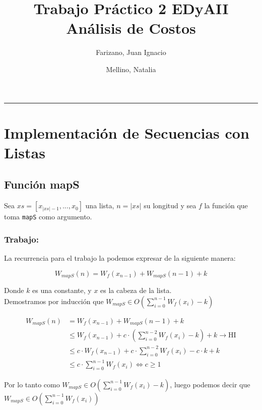 \documentclass[11pt]{article}
\title{Trabajo Práctico 2 EDyAII \\
        \large Análisis de Costos
}
\author{Farizano, Juan Ignacio \and Mellino, Natalia}
\date{}
\begin{document}
\maketitle

\noindent\rule{\textwidth}{1pt}
\section{Implementación de Secuencias con Listas}


\subsection{Función mapS}
Sea $xs = [x_{\vert xs \vert -1},...,x_0]$ una lista, $n = \vert xs \vert$ su longitud
y sea $f$ la función que toma \texttt{mapS} como argumento. 

\subsubsection{Trabajo:}
La recurrencia para el trabajo la podemos expresar de la siguiente manera:

\begin{equation*}
    W_{mapS}(n) = W_f(x_{n- 1}) + W_{mapS}(n - 1) + k
\end{equation*}

Donde $k$ es una constante, y $x$ es la cabeza de la lista. \\

Demostramos por inducción que $ W_{mapS} \in O\left(\displaystyle\sum_{i=0}^{n - 1}W_f(x_i) - k\right) $

\begin{align*}
    W_{mapS}(n) & = W_f(x_{n - 1}) + W_{mapS}(n - 1) + k \\
               & \leq W_f(x_{n - 1}) + c \cdot \left(\displaystyle\sum_{i=0}^{n - 2}W_f(x_i) - k\right) + k \rightarrow \text{HI} \\
               & \leq c \cdot  W_f(x_{n - 1}) + c \cdot \displaystyle\sum_{i=0}^{n - 2}W_f(x_i) - c \cdot k + k \\
               & \leq c \cdot \displaystyle\sum_{i=0}^{n - 1}W_f(x_i) \iff c \geq 1
\end{align*}

Por lo tanto como $ W_{mapS} \in O\left(\displaystyle\sum_{i=0}^{n - 1}W_f(x_i) - k\right) $,
luego podemos decir que $ W_{mapS} \in O\left(\displaystyle\sum_{i=0}^{n - 1}W_f(x_i)\right) $
\end{document}
